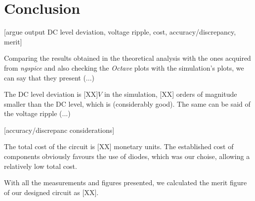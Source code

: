 \section{Conclusion}
\label{sec:conclusion}

[argue output DC level deviation, voltage ripple, cost, accuracy/discrepancy, merit]



Comparing the results obtained in the theoretical analysis  with the ones acquired from \textit{ngspice} and also checking the \textit{Octave} plots with the simulation's plots, we can say that they present (...)

The DC level deviation is [XX]$V$ in the simulation, [XX] orders of magnitude smaller than the DC level, which is (considerably good).
The same can be said of the voltage ripple (...)

[accuracy/discrepanc considerations]

The total cost of the circuit is [XX] monetary units. The established cost of components obviously favours the use of diodes, which was our choise, allowing a relatively low total cost.  

With all the measurements and figures presented, we calculated the merit figure of our designed circuit as [XX].




